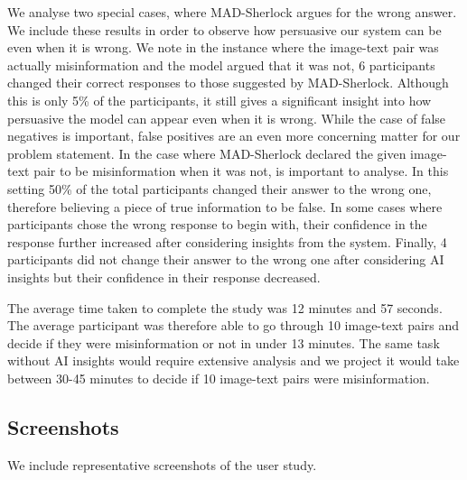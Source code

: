 \documentclass{article}
\theoremstyle{plain}
\theoremstyle{definition}
\theoremstyle{remark}
\newcommand{\frameworkname}{MAD-Sherlock}
\begin{document}
We analyse two special cases, where \frameworkname{} argues for the wrong answer. We include these results in order to observe how persuasive our system can be even when it is wrong. We note in the instance where the image-text pair was actually misinformation and the model argued that it was not, 6 participants changed their correct responses to those suggested by \frameworkname{}. Although this is only 5\% of the participants, it still gives a significant insight into how persuasive the model can appear even when it is wrong. While the case of false negatives is important, false positives are an even more concerning matter for our problem statement. In the case where \frameworkname{} declared the given image-text pair to be misinformation when it was not, is important to analyse. In this setting 50\% of the total participants changed their answer to the wrong one, therefore believing a piece of true information to be false. In some cases where participants chose the wrong response to begin with, their confidence in the response further increased after considering insights from the system. Finally, 4 participants did not change their answer to the wrong one after considering AI insights but their confidence in their response decreased.

The average time taken to complete the study was 12 minutes and 57 seconds. The average participant was therefore able to go through 10 image-text pairs and decide if they were misinformation or not in under 13 minutes. The same task without AI insights would require extensive analysis and we project it would take between 30-45 minutes to decide if 10 image-text pairs were misinformation.

\subsection{Screenshots}

We include representative screenshots of the user study. 
\end{document}
